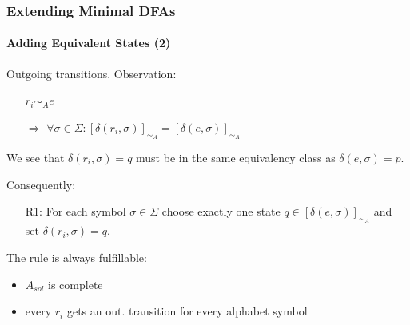 \documentclass[handout,10pt]{beamer}%
\begin{document}
	\begin{frame}
		\frametitle{Extending Minimal DFAs}
		\framesubtitle{Adding Equivalent States (2)}
		
		Outgoing transitions. Observation:
		\begin{itemize}
			\item[] $r_i \sim_A e$
			
			\item[$\Rightarrow$] $\forall \sigma \in \Sigma \colon [\delta(r_i, \sigma)]_{\sim_A} = [\delta(e, \sigma)]_{\sim_A}$
		\end{itemize}
	
		\vspace{0.2cm}
		We see that $\delta(r_i, \sigma) = q$ must be in the same equivalency class as $\delta(e, \sigma) = p$.
		
		\vspace{0.2cm}
		Consequently:
		\begin{itemize}
			\item[R1:] For each symbol $\sigma \in \Sigma$ choose exactly one state $q\in[\delta(e, \sigma)]_{\sim_A}$ and set $\delta(r_i, \sigma) = q$.
		\end{itemize}
	
		\vspace{0.2cm}
		The rule is always fulfillable:
		\begin{itemize}
			\item $A_{sol}$ is complete
			\item every $r_i$ gets an out. transition for every alphabet symbol
		\end{itemize}
	
	\end{frame}
\end{document}
